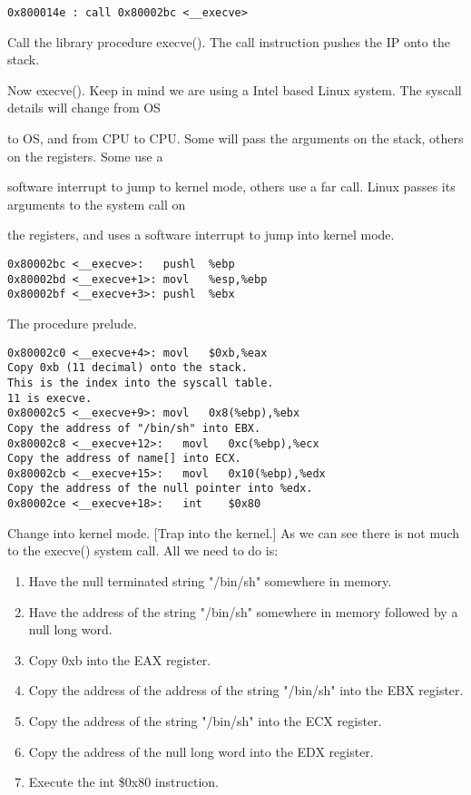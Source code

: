 \documentclass[10pt]{article}
\begin{document}
\begin{lstlisting}
0x800014e : call 0x80002bc <__execve>
\end{lstlisting}

Call the library procedure execve(). The call instruction pushes the IP onto the stack.

Now execve(). Keep in mind we are using a Intel based Linux system. The syscall details will change from OS 

to OS, and from CPU to CPU. Some will pass the arguments on the stack, others on the registers. Some use a 

software interrupt to jump to kernel mode, others use a far call. Linux passes its arguments to the system call on 

the registers, and uses a software interrupt to jump into kernel mode.

\begin{lstlisting}
0x80002bc <__execve>:   pushl  %ebp
0x80002bd <__execve+1>: movl   %esp,%ebp
0x80002bf <__execve+3>: pushl  %ebx
\end{lstlisting}

The procedure prelude. 

\begin{verbatim}
0x80002c0 <__execve+4>: movl   $0xb,%eax
Copy 0xb (11 decimal) onto the stack. 
This is the index into the syscall table. 
11 is execve. 
0x80002c5 <__execve+9>: movl   0x8(%ebp),%ebx
Copy the address of "/bin/sh" into EBX. 
0x80002c8 <__execve+12>:   movl   0xc(%ebp),%ecx
Copy the address of name[] into ECX. 
0x80002cb <__execve+15>:   movl   0x10(%ebp),%edx
Copy the address of the null pointer into %edx. 
0x80002ce <__execve+18>:   int    $0x80
\end{verbatim}

Change into kernel mode. [Trap into the kernel.] 
As we can see there is not much to the execve() system call. All we need to do is: 

\begin{enumerate}
\item Have the null terminated string "/bin/sh" somewhere in memory. 
\item Have the address of the string "/bin/sh" somewhere in memory followed by a null long word. 
\item Copy 0xb into the EAX register. 
\item Copy the address of the address of the string "/bin/sh" into the EBX register. 
\item Copy the address of the string "/bin/sh" into the ECX register. 
\item Copy the address of the null long word into the EDX register. 
\item Execute the int \$0x80 instruction. 
\end{enumerate}
\end{document}
